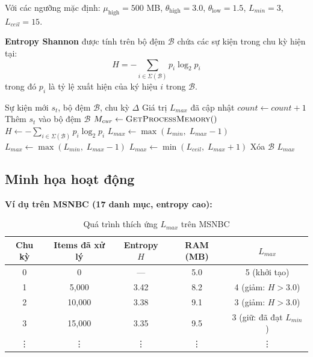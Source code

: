 \documentclass[14pt,a4paper,oneside]{extreport}
\begin{document}
Với các ngưỡng mặc định: $\mu_{\text{high}} = 500$ MB, $\theta_{\text{high}} = 3.0$, $\theta_{\text{low}} = 1.5$, $L_{min} = 3$, $L_{ceil} = 15$.

\textbf{Entropy Shannon} được tính trên bộ đệm $\mathcal{B}$ chứa các sự kiện trong chu kỳ hiện tại:
\begin{equation}
    H = -\sum_{i \in \Sigma(\mathcal{B})} p_i \log_2 p_i
\end{equation}
trong đó $p_i$ là tỷ lệ xuất hiện của ký hiệu $i$ trong $\mathcal{B}$.

\begin{algorithm}[!ht]
\small
\caption{Cập nhật maxPatternLength Thích ứng}
\label{alg:adaptive}
\begin{algorithmic}[1]
\REQUIRE Sự kiện mới $s_t$, bộ đệm $\mathcal{B}$, chu kỳ $\Delta$
\ENSURE Giá trị $L_{max}$ đã cập nhật
\STATE $\textit{count} \leftarrow \textit{count} + 1$
\STATE Thêm $s_t$ vào bộ đệm $\mathcal{B}$
    \STATE $M_{cur} \leftarrow \textsc{GetProcessMemory}()$ 
    \STATE $H \leftarrow -\sum_{i \in \Sigma(\mathcal{B})} p_i \log_2 p_i$ 
        \STATE $L_{max} \leftarrow \max(L_{min},\; L_{max} - 1)$ 
        \STATE $L_{max} \leftarrow \max(L_{min},\; L_{max} - 1)$ 
        \STATE $L_{max} \leftarrow \min(L_{ceil},\; L_{max} + 1)$ 
    \ENDIF
    \STATE Xóa $\mathcal{B}$ 
\ENDIF
\RETURN $L_{max}$
\end{algorithmic}
\end{algorithm}
\vspace{-0.5em}

\subsection{Minh họa hoạt động}
\textbf{Ví dụ trên MSNBC (17 danh mục, entropy cao):}

\begin{table}[H]
    \centering
    \caption{Quá trình thích ứng $L_{max}$ trên MSNBC}
    \label{tab:adaptive_example}
    \begin{tabular}{ccccc}
        \toprule
        \textbf{Chu kỳ} & \textbf{Items đã xử lý} & \textbf{Entropy $H$} & \textbf{RAM (MB)} & $L_{max}$ \\
        \midrule
        0  & 0      & ---   & 5.0   & 5 (khởi tạo) \\
        1  & 5,000  & 3.42  & 8.2   & 4 (giảm: $H > 3.0$) \\
        2  & 10,000 & 3.38  & 9.1   & 3 (giảm: $H > 3.0$) \\
        3  & 15,000 & 3.35  & 9.5   & 3 (giữ: đã đạt $L_{min}$) \\
        \vdots & \vdots & \vdots & \vdots & \vdots \\
        \bottomrule
    \end{tabular}
\end{table}
\end{document}
